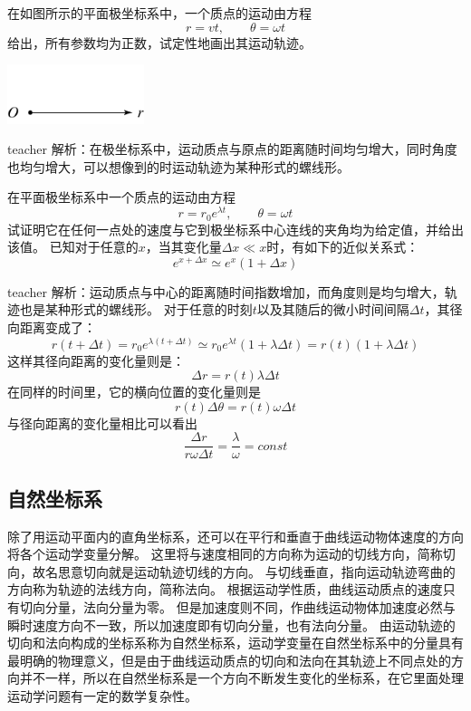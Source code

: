 \begin{example}
在如图所示的平面极坐标系中，一个质点的运动由方程
\[ r = vt,\qquad  \theta  = \omega t\]
给出，所有参数均为正数，试定性地画出其运动轨迹。
\begin{center}
\includegraphics[width=0.3\textwidth]{images/motion-problem-37.pdf}
\end{center}
\begin{taggedblock}{teacher}
\noindent
解析：在极坐标系中，运动质点与原点的距离随时间均匀增大，同时角度也均匀增大，可以想像到的时运动轨迹为某种形式的螺线形。
\end{taggedblock}
\end{example}


\begin{example}
在平面极坐标系中一个质点的运动由方程
\[
r = r_0 e^{\lambda t},\qquad \theta=\omega t
\]
试证明它在任何一点处的速度与它到极坐标系中心连线的夹角均为给定值，并给出该值。
已知对于任意的$x$，当其变化量$\Delta x\ll x$时，有如下的近似关系式：
\[e^{x+\Delta x}\simeq e^x(1+\Delta x)\]
\begin{taggedblock}{teacher}
\newline
解析：运动质点与中心的距离随时间指数增加，而角度则是均匀增大，轨迹也是某种形式的螺线形。
对于任意的时刻$t$以及其随后的微小时间间隔$\Delta t$，其径向距离变成了：
\[ r(t+\Delta t) =r_0 e^{\lambda (t+\Delta t)}\simeq r_0e^{\lambda t}(1+\lambda \Delta t)=r(t)(1+\lambda \Delta t)\]
这样其径向距离的变化量则是：
\[
\Delta r = r(t)\lambda\Delta t
\]
在同样的时间里，它的横向位置的变化量则是
\[ r(t)\Delta \theta  = r(t)\omega\Delta t \]
与径向距离的变化量相比可以看出
\[
\frac{\Delta r}{r \omega \Delta t} = \frac{\lambda}{\omega}=const
\]
\end{taggedblock}
\end{example}
\subsection{自然坐标系}
除了用运动平面内的直角坐标系，还可以在平行和垂直于曲线运动物体速度的方向将各个运动学变量分解。
这里将与速度相同的方向称为运动的{\heiti 切线方向}，简称{\heiti 切向}，故名思意切向就是运动轨迹切线的方向。
与切线垂直，指向运动轨迹弯曲的方向称为轨迹的{\heiti 法线方向}，简称{\heiti 法向}。
根据运动学性质，曲线运动质点的速度只有切向分量，法向分量为零。
但是加速度则不同，作曲线运动物体加速度必然与瞬时速度方向不一致，所以加速度即有切向分量，也有法向分量。
由运动轨迹的切向和法向构成的坐标系称为{\heiti 自然坐标系}，运动学变量在自然坐标系中的分量具有最明确的物理意义，但是由于曲线运动质点的切向和法向在其轨迹上不同点处的方向并不一样，所以在自然坐标系是一个方向不断发生变化的坐标系，在它里面处理运动学问题有一定的数学复杂性。


